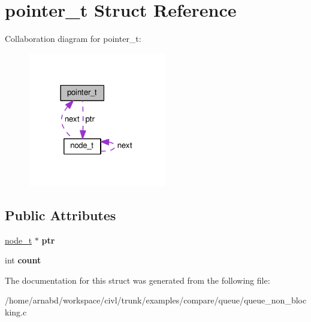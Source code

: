 \hypertarget{structpointer__t}{}\section{pointer\+\_\+t Struct Reference}
\label{structpointer__t}


Collaboration diagram for pointer\+\_\+t\+:
\nopagebreak
\begin{figure}[H]
\begin{center}
\leavevmode
\includegraphics[width=170pt]{structpointer__t__coll__graph}
\end{center}
\end{figure}
\subsection*{Public Attributes}
\begin{DoxyCompactItemize}
\item 
\hypertarget{structpointer__t_afc2b65cde90cb27c09c42e2e20bd52ec}{}\hyperlink{structnode__t}{node\+\_\+t} $\ast$ {\bfseries ptr}\label{structpointer__t_afc2b65cde90cb27c09c42e2e20bd52ec}

\item 
\hypertarget{structpointer__t_afd41803f56b33e24379bb2cf7784d2c4}{}int {\bfseries count}\label{structpointer__t_afd41803f56b33e24379bb2cf7784d2c4}

\end{DoxyCompactItemize}


The documentation for this struct was generated from the following file\+:\begin{DoxyCompactItemize}
\item 
/home/arnabd/workspace/civl/trunk/examples/compare/queue/queue\+\_\+non\+\_\+blocking.\+c\end{DoxyCompactItemize}
